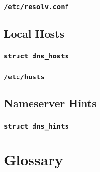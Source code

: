 \documentclass[11pt]{article}
\begin{document}
\subsubsection{\texttt{/etc/resolv.conf}}

\subsection{Local Hosts}

\subsubsection{\texttt{struct dns\_hosts}}

\subsubsection{\texttt{/etc/hosts}}

\subsection{Nameserver Hints}

\subsubsection{\texttt{struct dns\_hints}}


\section{Glossary}
\end{document}
